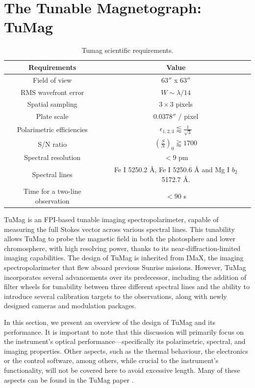 \section{The Tunable Magnetograph: TuMag}

\begin{table}
    \centering
   \begin{tabular}{cc}
    \hline
    \hline
    Requirements & Value \\
    \hline
    Field of view & $63''$ x $63''$ \\
    RMS wavefront error & $W \sim \lambda / 14$\\
    Spatial sampling & $3 \times 3 $ pixels \\
    Plate scale & $0.0378''$ / pixel \\
    Polarimetric efficiencies & $\epsilon _ {1, 2, 3} \lessapprox \frac{1}{\sqrt{3}}$\\
    S/N ratio & $\left(\frac{S}{N}\right) _ 0 \gtrapprox 1700$ \\
    Spectral resolution & $< 9$ pm\\  
    Spectral lines & Fe I 5250.2 \r{A}, Fe I 5250.6 \r{A} and Mg I $b_2$ 5172.7 \r{A}. \\
    Time for a two-line observation & $< 90$ s\\
    \hline
    \hline
    \end{tabular}
    \caption{Tumag scientific requirements.}
    \label{table: Tumags requirements}
\end{table}

TuMag is an FPI-based tunable imaging spectropolarimeter, capable of measuring the full Stokes vector across various spectral lines. This tunability allows TuMag to probe the magnetic field in both the photosphere and lower chromosphere, with high resolving power, thanks to its near-diffraction-limited imaging capabilities. The design of TuMag is inherited from IMaX, the imaging spectropolarimeter that flew aboard previous Sunrise missions. However, TuMag incorporates several advancements over its predecessor, including the addition of filter wheels for tunability between three different spectral lines and the ability to introduce several calibration targets to the observations, along with newly designed cameras and modulation packages.

In this section, we present an overview of the design of TuMag  and its performance. It is important to note that this discussion will primarily focus on the instrument's optical performance—specifically its polarimetric, spectral, and imaging properties. Other aspects, such as the thermal behaviour, the electronics or the control software, among others, while crucial to the instrument's functionality, will not be covered here to avoid excessive length. Many of these aspects can be found in the TuMag paper \citep{tumag}.


